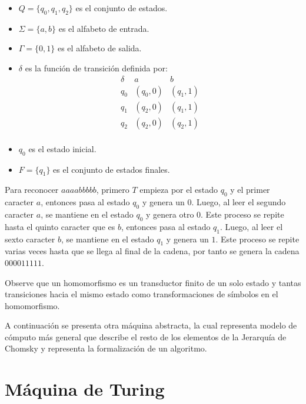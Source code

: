 \begin{itemize}
      \item \(Q = \{q_0, q_1, q_2\}\) es el conjunto de estados.
      \item \(\Sigma = \{a, b\}\) es el alfabeto de entrada.
      \item \(\Gamma = \{0, 1\}\) es el alfabeto de salida.
      \item \(\delta\) es la función de transición definida por:
            \[
                  \begin{array}{c|c|c}
                        \delta & a        & b        \\
                        \hline
                        q_0    & (q_0, 0) & (q_1, 1) \\
                        q_1    & (q_2, 0) & (q_1, 1) \\
                        q_2    & (q_2, 0) & (q_2, 1) \\
                  \end{array}
            \]
      \item \(q_0\) es el estado inicial.
      \item \(F = \{q_1\}\) es el conjunto de estados finales.
\end{itemize}

Para reconocer $aaaabbbbb$, primero $T$ empieza por el estado $q_0$ y el primer caracter $a$, entonces pasa al estado $q_0$ y genera un $0$.
Luego, al leer el segundo caracter $a$, se mantiene en el estado $q_0$ y genera otro $0$. Este proceso se repite hasta el quinto caracter
que es $b$, entonces pasa al estado $q_1$. Luego, al leer el sexto caracter $b$, se mantiene en el estado $q_1$ y genera un $1$. Este proceso
se repite varias veces hasta que se llega al final de la cadena, por tanto se genera la cadena $000011111$.

Observe que un homomorfismo es un transductor finito de un solo estado y tantas transiciones hacia el mismo estado como transformaciones de símbolos en el homomorfismo.

A continuación se presenta otra máquina abstracta, la cual representa modelo de cómputo más general que describe el resto de los elementos de la Jerarquía de Chomsky y 
representa la formalización de un algoritmo.


\section{Máquina de Turing}

